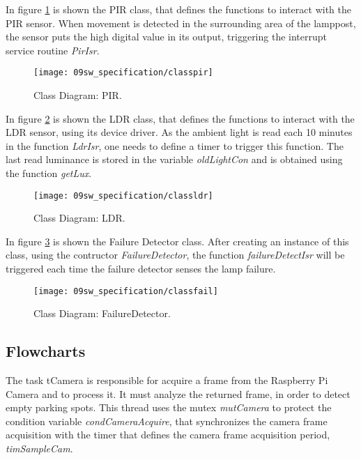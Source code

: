 
In figure \ref{fig:classpir} is shown the PIR class, that defines the functions to interact with the PIR sensor. When movement is detected in the surrounding area of the lamppost, the sensor puts the high digital value in its output, triggering the interrupt service routine \textit{PirIsr}.

\begin{figure}[H]
	\centering
	\texttt{[image: 09sw\_specification/classpir]}
	\caption{Class Diagram: PIR.}
	\label{fig:classpir}
\end{figure}


In figure \ref{fig:classldr} is shown the LDR class, that defines the functions to interact with the LDR sensor, using its device driver. As the ambient light is read each 10 minutes in the function \textit{LdrIsr}, one needs to define a timer to trigger this function. The last read luminance is stored in the variable \textit{oldLightCon} and is obtained using the function \textit{getLux}.

\begin{figure}[H]
	\centering
	\texttt{[image: 09sw\_specification/classldr]}
	\caption{Class Diagram: LDR.}
	\label{fig:classldr}
\end{figure}

\clearpage
{}

In figure \ref{fig:classfail} is shown the Failure Detector class. After creating an instance of this class, using the contructor \textit{FailureDetector}, the function \textit{failureDetectIsr} will be triggered each time the failure detector senses the lamp failure. 

\begin{figure}[H]
	\centering
	\texttt{[image: 09sw\_specification/classfail]}
	\caption{Class Diagram: FailureDetector.}
	\label{fig:classfail}
\end{figure}

\subsection{Flowcharts}
{}

The task tCamera is responsible for acquire a frame from the Raspberry Pi Camera and to process it. It must analyze the returned frame, in order to detect empty parking spots. This thread uses the mutex \textit{mutCamera} to protect the condition variable \textit{condCameraAcquire}, that synchronizes the camera frame acquisition with the timer that defines the camera frame acquisition period, \textit{timSampleCam}.

